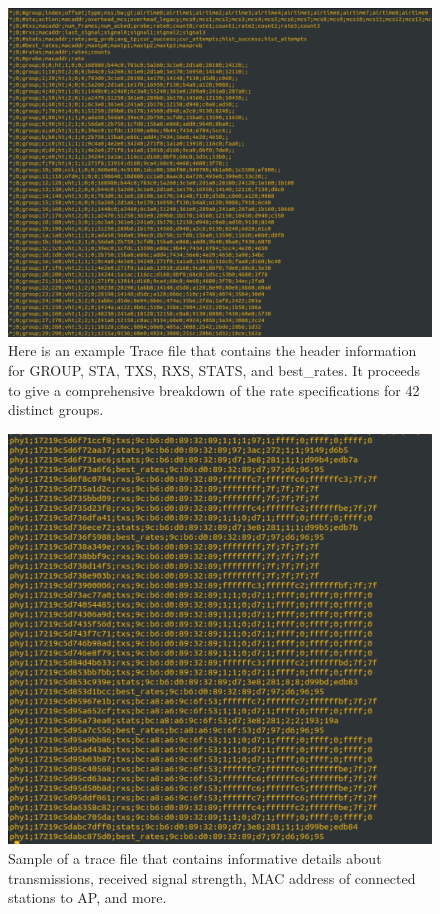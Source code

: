 \begin{figure}[htbp]
  \centering
  \includegraphics[width=\textwidth]{figures/plots/ratetable.png}
  \caption[Trace File Header]{Here is an example Trace file that contains the header information for GROUP, STA, TXS, RXS, STATS, and best\_rates. It proceeds to give a comprehensive breakdown of the rate specifications for 42 distinct groups.}
  \label{fig:plot_csv1}
\end{figure}

\begin{figure}[htbp]
  \centering
  \includegraphics[width=\textwidth]{figures/plots/traceexp.png}
  \caption[Trace File Sample]{Sample of a trace file that contains informative details about transmissions, received signal strength, MAC address of connected stations to AP, and more.}
  \label{fig:plot_csv2}
\end{figure}



